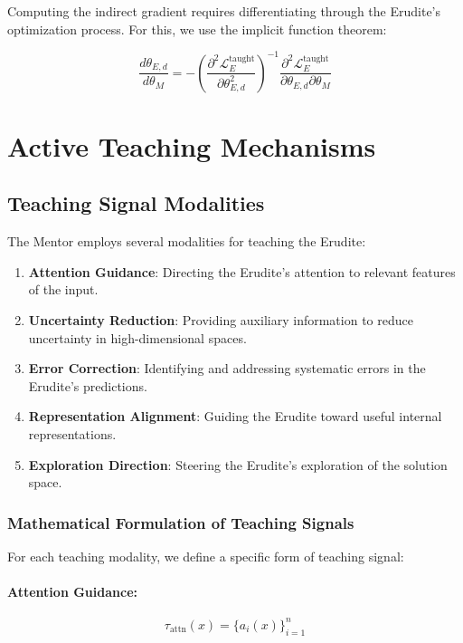 Computing the indirect gradient requires differentiating through the Erudite's optimization process. For this, we use the implicit function theorem:

\begin{equation}
\frac{d\theta_{E,d}}{d\theta_M} = -\left(\frac{\partial^2 \mathcal{L}_{E}^{\text{taught}}}{\partial \theta_{E,d}^2}\right)^{-1} \frac{\partial^2 \mathcal{L}_{E}^{\text{taught}}}{\partial \theta_{E,d} \partial \theta_M}
\end{equation}

\section{Active Teaching Mechanisms}

\subsection{Teaching Signal Modalities}

The Mentor employs several modalities for teaching the Erudite:

\begin{enumerate}
\item \textbf{Attention Guidance}: Directing the Erudite's attention to relevant features of the input.

\item \textbf{Uncertainty Reduction}: Providing auxiliary information to reduce uncertainty in high-dimensional spaces.

\item \textbf{Error Correction}: Identifying and addressing systematic errors in the Erudite's predictions.

\item \textbf{Representation Alignment}: Guiding the Erudite toward useful internal representations.

\item \textbf{Exploration Direction}: Steering the Erudite's exploration of the solution space.
\end{enumerate}

\subsubsection{Mathematical Formulation of Teaching Signals}

For each teaching modality, we define a specific form of teaching signal:

\paragraph{Attention Guidance:}
\begin{equation}
\tau_{\text{attn}}(x) = \{a_i(x)\}_{i=1}^n
\end{equation}

